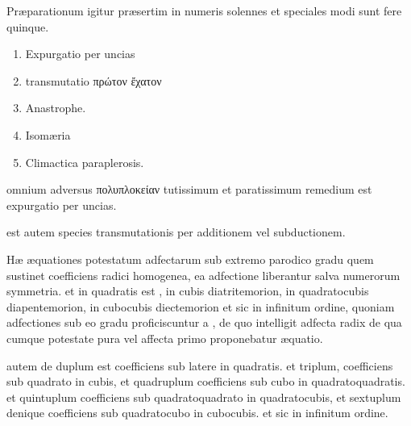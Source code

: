\documentclass[11pt,a4paper]{article}
\begin{document}
Præparationum igitur præsertim in numeris solennes et speciales modi sunt fere quinque.
\begin{enumerate}
\item Expurgatio per uncias
\item transmutatio πρώτον ἔχατον
\item Anastrophe.
\item Isomæria
\item Climactica paraplerosis.
\end{enumerate}

omnium adversus πολυπλοκείαν tutissimum et paratissimum remedium est expurgatio per uncias.

est autem species transmutationis per additionem vel subductionem.


Hæ æquationes potestatum adfectarum sub extremo parodico gradu quem sustinet coefficiens radici homogenea, \ill{} ea adfectione liberantur salva numerorum symmetria. et in quadratis est , in cubis diatritemorion,   in quadratocubis diapentemorion, in cubocubis diectemorion et sic in infinitum ordine, quoniam adfectiones sub eo gradu proficiscuntur a \ill{}, de \ill{} quo intelligit adfecta radix de qua cumque potestate pura vel affecta primo proponebatur æquatio.

 autem \ill{} de \ill{} duplum est coefficiens sub latere in quadratis. et triplum, coefficiens sub quadrato in cubis, et quadruplum coefficiens sub cubo in quadratoquadratis. et quintuplum coefficiens  sub quadratoquadrato in quadratocubis, et sextuplum denique coefficiens sub quadratocubo in cubocubis. et sic in infinitum ordine.
\end{document}
